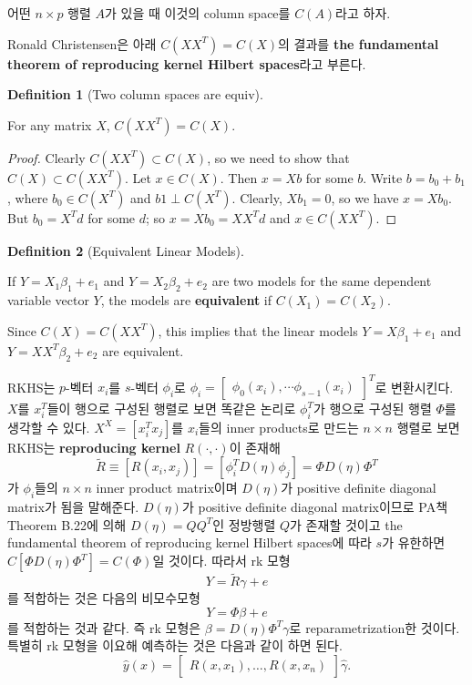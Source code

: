 \documentclass[
  letterpaper,
  DIV=11,
  numbers=noendperiod]{scrreprt}
\theoremstyle{definition}
\newtheorem{definition}{Definition}[chapter]
\theoremstyle{plain}
\theoremstyle{definition}
\theoremstyle{definition}
\theoremstyle{remark}
\begin{document}
어떤 \(n\times p\) 행렬 \(A\)가 있을 때 이것의 column space를
\(C(A)\)라고 하자.

Ronald Christensen은 아래 \(C(XX^T)=C(X)\)의 결과를 \textbf{the
fundamental theorem of reproducing kernel Hilbert spaces}라고 부른다.

\begin{definition}[Two column spaces are
equiv]\protect\hypertarget{def-equivcs}{}\label{def-equivcs}

For any matrix \(X\), \(C(XX^T)=C(X)\).

\end{definition}

\begin{proof}
Clearly \(C(XX^T)\subset C(X)\), so we need to show that
\(C(X) \subset C(XX^T)\). Let \(x \in C(X)\). Then \(x = Xb\) for some
\(b\). Write \(b=b_0 + b_1\), where \(b_0 \in C(X^T)\) and
\(b1 \perp C(X^T)\). Clearly, \(Xb_1 = 0\), so we have \(x=Xb_0\). But
\(b_0=X^Td\) for some \(d\); so \(x=Xb_0=XX^Td\) and \(x\in C(XX^T)\).
\end{proof}

\begin{definition}[Equivalent Linear
Models]\protect\hypertarget{def-equivlm}{}\label{def-equivlm}

If \(Y=X_1 \beta_1 + e_1\) and \(Y = X_2 \beta_2 +e_2\) are two models
for the same dependent variable vector \(Y\), the models are
\textbf{equivalent} if \(C(X_1) = C(X_2)\).

Since \(C(X) = C(XX^T)\), this implies that the linear models
\(Y= X\beta_1 +e_1\) and \(Y=XX^T\beta_2 +e_2\) are equivalent.

\end{definition}

RKHS는 \(p\)-벡터 \(x_i\)를 \(s\)-벡터 \(\phi_i\)로
\(\phi_i =\begin{bmatrix} \phi_0 (x_i), \cdots \phi_{s-1}(x_i) \end{bmatrix}^T\)로
변환시킨다. \(X\)를 \(x_i^T\)들이 행으로 구성된 행렬로 보면 똑같은
논리로 \(\phi_i^T\)가 행으로 구성된 행렬 \(\Phi\)를 생각할 수 있다.
\(X^X=[x_i^Tx_j]\)를 \(x_i\)들의 inner products로 만드는 \(n\times n\)
행렬로 보면 RKHS는 \textbf{reproducing kernel} \(R(\cdot, \cdot)\)이
존재해 \[
\tilde{R} \equiv [ R(x_i, x_j)]= [\phi_i^T D(\eta) \phi_j] = \Phi D(\eta) \Phi^T
\] 가 \(\phi_i\)들의 \(n\times n\) inner product matrix이며
\(D(\eta)\)가 positive definite diagonal matrix가 됨을 말해준다.
\(D(\eta)\)가 positive definite diagonal matrix이므로 PA책 Theorem
B.22에 의해 \(D(\eta)=QQ^T\)인 정방행렬 \(Q\)가 존재할 것이고 the
fundamental theorem of reproducing kernel Hilbert spaces에 따라 \(s\)가
유한하면 \(C[\Phi D(\eta) \Phi^T] = C(\Phi)\)일 것이다. 따라서 rk 모형
\[
Y = \tilde{R}\gamma + e
\] 를 적합하는 것은 다음의 비모수모형 \[
Y = \Phi \beta + e
\] 를 적합하는 것과 같다. 즉 rk 모형은 \(\beta=D(\eta) \Phi^T \gamma\)로
reparametrization한 것이다. 특별히 rk 모형을 이요해 예측하는 것은 다음과
같이 하면 된다. \[
\hat{y}(x) = \begin{bmatrix} R(x,x_1), \ldots, R(x,x_n) \end{bmatrix} \hat{\gamma}.
\]
\end{document}

